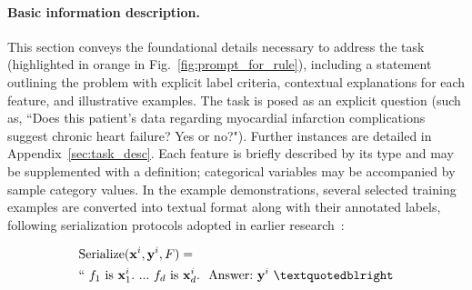 \vspace*{-0.12in}
\paragraph{Basic information description.} This section conveys the foundational details necessary to address the task (highlighted in orange in Fig.~\ref{fig:prompt_for_rule}), including a statement outlining the problem with explicit label criteria, contextual explanations for each feature, and illustrative examples. The task is posed as an explicit question (such as, ``Does this patient's data regarding myocardial infarction complications suggest chronic heart failure? Yes or no?"). Further instances are detailed in Appendix~\ref{sec:task_desc}. Each feature is briefly described by its type and may be supplemented with a definition; categorical variables may be accompanied by sample category values. In the example demonstrations, several selected training examples are converted into textual format along with their annotated labels, following serialization protocols adopted in earlier research~\cite{dinh2022lift,hegselmann2023tabllm}:

\begin{align}
&\text{Serialize}(\mathbf{x}^i,\mathbf{y}^i, F) = \nonumber \\ 
&``\ f_1\ \text{is}\ \mathbf{x}^i_1.\ ... \ f_d\  \text{is}\  \mathbf{x}^i_d.\ \ \text{Answer:}\  \mathbf{y}^i\ ”
\end{align}

\vspace*{-0.12in}
